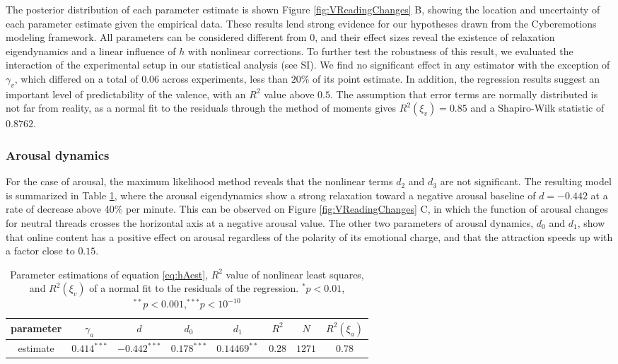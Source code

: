 \documentclass[nologo,url,11pt,a4paper]{ETHpaper}
\begin{document}
The posterior distribution of each parameter estimate is shown Figure  \ref{fig:VReadingChanges} B, showing the location and
uncertainty of each parameter estimate given the empirical data.   These
results lend strong evidence for our hypotheses drawn from the Cyberemotions
modeling framework. All parameters can be considered different from $0$, and
their effect sizes reveal the existence of  relaxation eigendynamics and a
linear  influence of $h$ with nonlinear corrections. To further test the
robustness of this result, we evaluated  the interaction of the experimental
setup in our statistical analysis (see SI). We find no significant effect in
any estimator with the exception of $\gamma_v$, which differed on a
total of $0.06$ across experiments, less than $20\%$ of its point estimate. In
addition, the regression results suggest an important level of predictability
of the valence, with an $R^2$ value above $0.5$. The assumption that error terms
are normally distributed is not far from reality, as a normal fit to the
residuals through the method of moments gives $R^2(\xi_v)=0.85$ and a Shapiro-Wilk statistic of $0.8762$.

\subsubsection{Arousal dynamics}

For the case of arousal, the maximum likelihood method reveals that the
nonlinear terms $d_2$ and $d_3$ are not significant. The
resulting model is summarized in Table \ref{tab:AregAll}, where the arousal
eigendynamics show a strong relaxation toward a negative arousal baseline of
$d=-0.442$ at a rate of decrease above 40\% per minute. This can be
observed on Figure \ref{fig:VReadingChanges} C, in which the
function of arousal changes for neutral threads crosses the horizontal axis at
a negative arousal value. The other two parameters of arousal dynamics,
$d_0$ and $d_1$, show that online content has a positive
effect on arousal regardless of the polarity of its emotional charge, and that
the attraction speeds up with a factor close to $0.15$. 

\begin{table}[!ht]
\centering
\begin{tabular}{ c | c  c  c  c | c  c c }
parameter 	& $\gamma_a$		& $d$   			& $d_0$  			& $d_1$   	 & $R^2$  & $N$  & $R^2(\xi_a)$  \\ \hline 
estimate    & $0.414^{***}$	& $-0.442^{***}$	& $0.178^{***}$ 	& $0.14469^{**}$ & $0.28$ & $1271$ & $0.78$
\end{tabular}
\caption{Parameter estimations of equation \ref{eq:hAest}, $R^2$ value of
nonlinear least squares, and  $R^2(\xi_v)$ of a normal fit to the residuals of
the regression.    $^{*} p<0.01$, $^{**} p<0.001$,$^{***} p<10^{-10}$
\label{tab:AregAll}}
\end{table}
\end{document}
